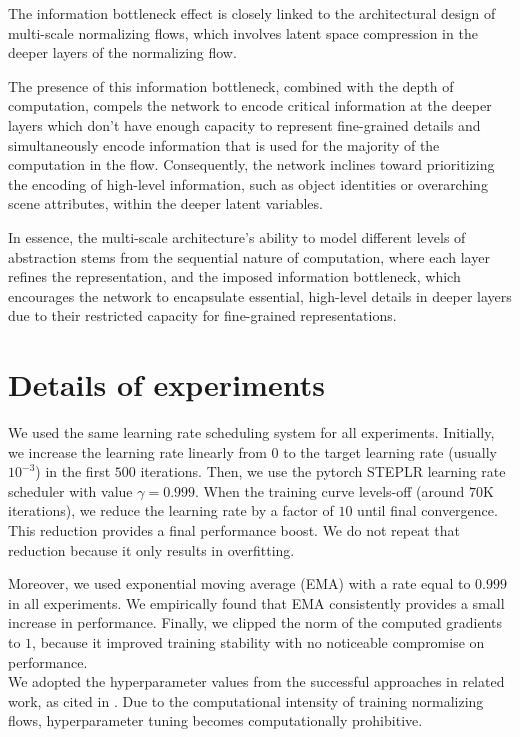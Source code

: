 The information bottleneck effect is closely linked to the architectural design of multi-scale normalizing flows, which involves latent space compression in the deeper layers of the normalizing flow.

The presence of this information bottleneck, combined with the depth of computation, compels the network to encode critical information at the deeper layers which don't have enough capacity to represent fine-grained details and simultaneously encode information that is used for the majority of the computation in the flow. Consequently, the network inclines toward prioritizing the encoding of high-level information, such as object identities or overarching scene attributes, within the deeper latent variables.

In essence, the multi-scale architecture's ability to model different levels of abstraction stems from the sequential nature of computation, where each layer refines the representation, and the imposed information bottleneck, which encourages the network to encapsulate essential, high-level details in deeper layers due to their restricted capacity for fine-grained representations.
\color{black}

\section{Details of experiments}\label{ch1:sec:details-of-experiments}
We used the same learning rate scheduling system for all experiments. Initially, we increase the learning rate linearly from $0$ to the target learning rate (usually $10^{-3}$) in the first $500$ iterations. Then, we use the pytorch STEPLR learning rate scheduler with value $\gamma = 0.999$. When the training curve levels-off (around $70$K iterations), we reduce the learning rate by a factor of $10$ until final convergence. This reduction provides a final performance boost. We do not repeat that reduction because it only results in overfitting. 

Moreover, we used exponential moving average (EMA) with a rate equal to $0.999$ in all experiments. We empirically found that EMA consistently provides a small increase in performance. Finally, we clipped the norm of the computed gradients to $1$, because it improved training stability with no noticeable compromise on performance. \\
 We adopted the hyperparameter values from the successful approaches in related work, as cited in \cite{Dual-Glow}. Due to the computational intensity of training normalizing flows, hyperparameter tuning becomes computationally prohibitive.\color{black}


